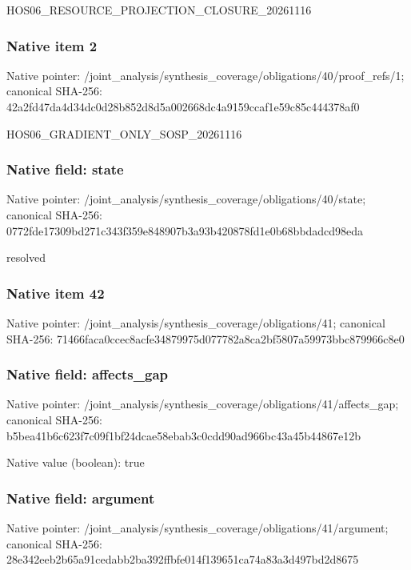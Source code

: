 \documentclass[10pt,a4paper]{article}
\begin{document}
\begingroup\raggedright\sloppy HOS06\_\allowbreak{}RESOURCE\_\allowbreak{}PROJECTION\_\allowbreak{}CLOSURE\_\allowbreak{}20261116\par\endgroup

\subsubsection{Native item 2}
Native pointer: /joint\_\allowbreak{}analysis/synthesis\_\allowbreak{}coverage/obligations/40/proof\_\allowbreak{}refs/1; canonical SHA-256: 42a2fd47da4d34dc0d28b852d8d5a002668dc4a9159ccaf1e59c85c444378af0

\begingroup\raggedright\sloppy HOS06\_\allowbreak{}GRADIENT\_\allowbreak{}ONLY\_\allowbreak{}SOSP\_\allowbreak{}20261116\par\endgroup

\subsubsection{Native field: state}
Native pointer: /joint\_\allowbreak{}analysis/synthesis\_\allowbreak{}coverage/obligations/40/state; canonical SHA-256: 0772fde17309bd271c343f359e848907b3a93b420878fd1e0b68bbdadcd98eda

\begingroup\raggedright\sloppy resolved\par\endgroup

\subsubsection{Native item 42}
Native pointer: /joint\_\allowbreak{}analysis/synthesis\_\allowbreak{}coverage/obligations/41; canonical SHA-256: 71466faca0ccec8acfe34879975d077782a8ca2bf5807a59973bbc879966c8e0

\subsubsection{Native field: affects\_\allowbreak{}gap}
Native pointer: /joint\_\allowbreak{}analysis/synthesis\_\allowbreak{}coverage/obligations/41/affects\_\allowbreak{}gap; canonical SHA-256: b5bea41b6c623f7c09f1bf24dcae58ebab3c0cdd90ad966bc43a45b44867e12b

Native value (boolean): true

\subsubsection{Native field: argument}
Native pointer: /joint\_\allowbreak{}analysis/synthesis\_\allowbreak{}coverage/obligations/41/argument; canonical SHA-256: 28e342eeb2b65a91cedabb2ba392ffbfe014f139651ca74a83a3d497bd2d8675
\end{document}
